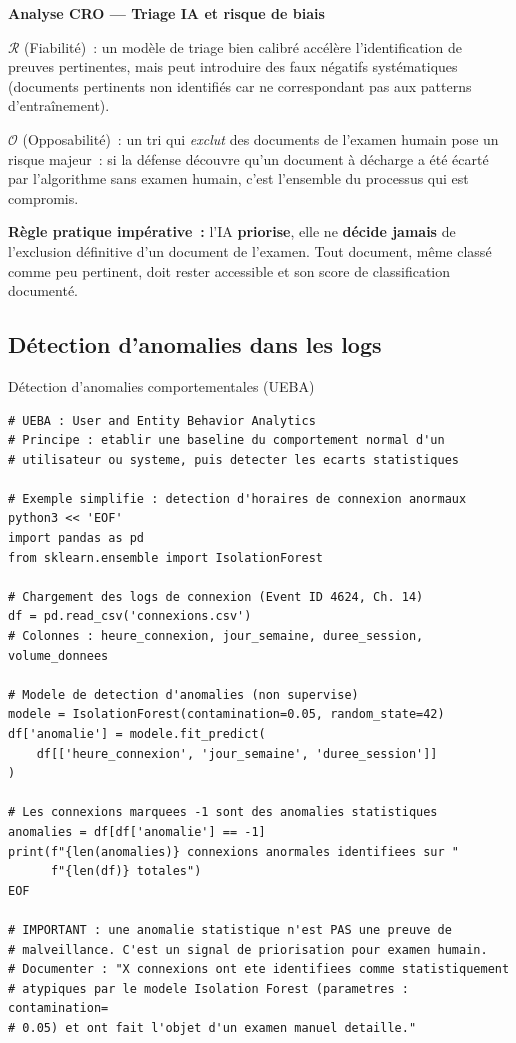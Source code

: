 \begin{boxCRO}
\textbf{Analyse CRO --- Triage IA et risque de biais}

$\mathcal{R}$ (Fiabilité)~: un modèle de triage bien calibré accélère
l'identification de preuves pertinentes, mais peut introduire des
faux négatifs systématiques (documents pertinents non identifiés
car ne correspondant pas aux patterns d'entraînement).

$\mathcal{O}$ (Opposabilité)~: un tri qui \emph{exclut} des documents
de l'examen humain pose un risque majeur~: si la défense découvre
qu'un document à décharge a été écarté par l'algorithme sans examen
humain, c'est l'ensemble du processus qui est compromis.


\textbf{Règle pratique impérative~:} l'IA \textbf{priorise}, elle
ne \textbf{décide jamais} de l'exclusion définitive d'un document
de l'examen. Tout document, même classé comme peu pertinent, doit
rester accessible et son score de classification documenté.
\end{boxCRO}

\subsection{Détection d'anomalies dans les logs}

\begin{boxoutils}{Détection d'anomalies comportementales (UEBA)}
\begin{lstlisting}[language=bash_forensique]
# UEBA : User and Entity Behavior Analytics
# Principe : etablir une baseline du comportement normal d'un
# utilisateur ou systeme, puis detecter les ecarts statistiques

# Exemple simplifie : detection d'horaires de connexion anormaux
python3 << 'EOF'
import pandas as pd
from sklearn.ensemble import IsolationForest

# Chargement des logs de connexion (Event ID 4624, Ch. 14)
df = pd.read_csv('connexions.csv')
# Colonnes : heure_connexion, jour_semaine, duree_session, volume_donnees

# Modele de detection d'anomalies (non supervise)
modele = IsolationForest(contamination=0.05, random_state=42)
df['anomalie'] = modele.fit_predict(
    df[['heure_connexion', 'jour_semaine', 'duree_session']]
)

# Les connexions marquees -1 sont des anomalies statistiques
anomalies = df[df['anomalie'] == -1]
print(f"{len(anomalies)} connexions anormales identifiees sur "
      f"{len(df)} totales")
EOF

# IMPORTANT : une anomalie statistique n'est PAS une preuve de
# malveillance. C'est un signal de priorisation pour examen humain.
# Documenter : "X connexions ont ete identifiees comme statistiquement
# atypiques par le modele Isolation Forest (parametres : contamination=
# 0.05) et ont fait l'objet d'un examen manuel detaille."
\end{lstlisting}
\end{boxoutils}

